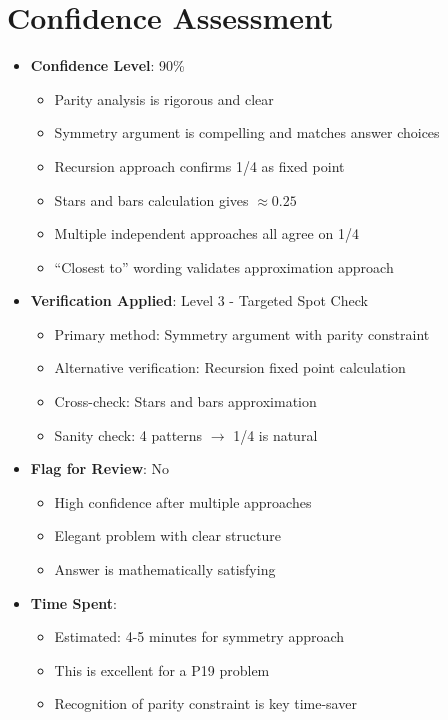 \documentclass[12pt]{article}
\begin{document}
\section*{Confidence Assessment}
\begin{itemize}[leftmargin=*]
    \item \textbf{Confidence Level}: 90\% 
    \begin{itemize}
        \item Parity analysis is rigorous and clear
        \item Symmetry argument is compelling and matches answer choices
        \item Recursion approach confirms 1/4 as fixed point
        \item Stars and bars calculation gives $\approx 0.25$
        \item Multiple independent approaches all agree on 1/4
        \item ``Closest to'' wording validates approximation approach
    \end{itemize}
    \item \textbf{Verification Applied}: Level 3 - Targeted Spot Check
    \begin{itemize}
        \item Primary method: Symmetry argument with parity constraint
        \item Alternative verification: Recursion fixed point calculation
        \item Cross-check: Stars and bars approximation
        \item Sanity check: 4 patterns $\to$ 1/4 is natural
    \end{itemize}
    \item \textbf{Flag for Review}: No
    \begin{itemize}
        \item High confidence after multiple approaches
        \item Elegant problem with clear structure
        \item Answer is mathematically satisfying
    \end{itemize}
    \item \textbf{Time Spent}: 
    \begin{itemize}
        \item Estimated: 4-5 minutes for symmetry approach
        \item This is excellent for a P19 problem
        \item Recognition of parity constraint is key time-saver
    \end{itemize}
\end{itemize}
\end{document}
